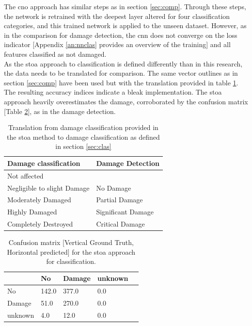 \noindent The \ac{cno} approach has similar steps as in section \ref{sec:comp}. Through these steps, the network is retrained with the deepest layer altered for four classification categories, and this trained network is applied to the unseen dataset. However, as in the comparison for damage detection, the \ac{cnn} does not converge on the loss indicator [Appendix \ref{an:nnclas} provides an overview of the training] and all features classified as not damaged.\\

\noindent As the \ac{stoa} approach to classification is defined differently than in this research, the data needs to be translated for comparison. The same vector outlines as in section \ref{sec:comp} have been used but with the translation provided in table \ref{tab:clastrans3}. The resulting accuracy indices indicate a bleak implementation. The \ac{stoa} approach heavily overestimates the damage, corroborated by the confusion matrix [Table \ref{tab:confcop2}], as in the damage detection.\\

\begin{table} [H]
	\centering
	\footnotesize
	\captionsetup{justification=raggedright,singlelinecheck=false}
	\caption{\footnotesize{Translation from damage classification provided in the \ac{stoa} method to damage classification as defined in section \ref{sec:clas}}}	
	\begin{tabular}{ll}
		\toprule
		Damage classification & Damage Detection \\
		\midrule			
		Not affected &\\
		Negligible to slight Damage & No Damage\\
		\midrule	
		Moderately Damaged & Partial Damage\\
		\midrule
		Highly Damaged & Significant Damage\\
		\midrule
		Completely Destroyed & Critical Damage\\
		\bottomrule
	\end{tabular}
	\label{tab:clastrans3}
\end{table} 

\begin{table} [H]
	\centering
	\footnotesize
	\captionsetup{justification=raggedright,singlelinecheck=false}
	\caption{Confusion matrix [Vertical Ground Truth, Horizontal predicted] for the \ac{stoa} approach for classification.}	
	\begin{tabular}{l|llll}
		& No    & Damage & unknown &  \\ \hline
		No      & 142.0 & 377.0  & 0.0     &  \\
		Damage  & 51.0  & 270.0  & 0.0     &  \\
		unknown & 4.0   & 12.0   & 0.0     &  \\
	\end{tabular}
	\label{tab:confcop2}
\end{table}

